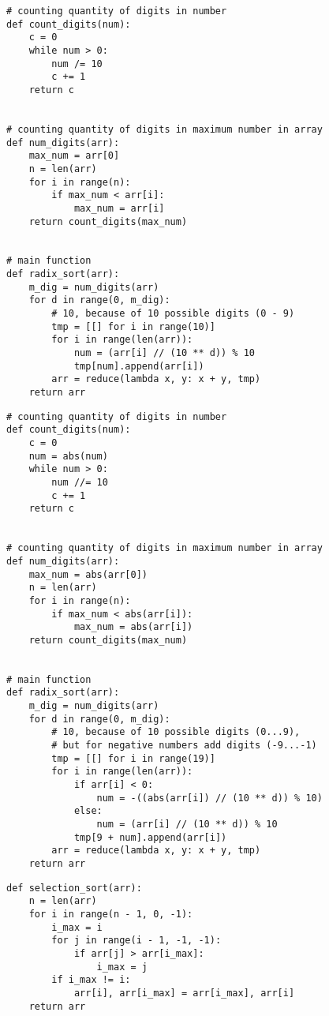 \begin{lstlisting}[caption=Функция алгоритма поразрядной сортировки (классическая реализация для сортировки целых неотрицательных чисел),
    label={radix_sort}]
# counting quantity of digits in number
def count_digits(num):
    c = 0
    while num > 0:
        num /= 10
        c += 1
    return c


# counting quantity of digits in maximum number in array
def num_digits(arr):
    max_num = arr[0]
    n = len(arr)
    for i in range(n):
        if max_num < arr[i]:
            max_num = arr[i]
    return count_digits(max_num)


# main function
def radix_sort(arr):
    m_dig = num_digits(arr)
    for d in range(0, m_dig):
        # 10, because of 10 possible digits (0 - 9)
        tmp = [[] for i in range(10)]
        for i in range(len(arr)):
            num = (arr[i] // (10 ** d)) % 10
            tmp[num].append(arr[i])
        arr = reduce(lambda x, y: x + y, tmp)
    return arr

\end{lstlisting}

\begin{lstlisting}[caption=Функция алгоритма поразрядной сортировки (модифицированная реализация для сортировки целых чисел),
	label={radix_sort2}]
# counting quantity of digits in number
def count_digits(num):
    c = 0
    num = abs(num)
    while num > 0:
        num //= 10
        c += 1
    return c


# counting quantity of digits in maximum number in array
def num_digits(arr):
    max_num = abs(arr[0])
    n = len(arr)
    for i in range(n):
        if max_num < abs(arr[i]):
            max_num = abs(arr[i])
    return count_digits(max_num)


# main function
def radix_sort(arr):
    m_dig = num_digits(arr)
    for d in range(0, m_dig):
        # 10, because of 10 possible digits (0...9),
        # but for negative numbers add digits (-9...-1)
        tmp = [[] for i in range(19)]
        for i in range(len(arr)):
            if arr[i] < 0:
                num = -((abs(arr[i]) // (10 ** d)) % 10)
            else:
                num = (arr[i] // (10 ** d)) % 10
            tmp[9 + num].append(arr[i])
        arr = reduce(lambda x, y: x + y, tmp)
    return arr
\end{lstlisting}

\begin{lstlisting}[caption=Функция алгоритма сортировки выбором,
	label={selection_sort}]
def selection_sort(arr):
    n = len(arr)
    for i in range(n - 1, 0, -1):
        i_max = i
        for j in range(i - 1, -1, -1):
            if arr[j] > arr[i_max]:
                i_max = j
        if i_max != i:
            arr[i], arr[i_max] = arr[i_max], arr[i]
    return arr
\end{lstlisting}

